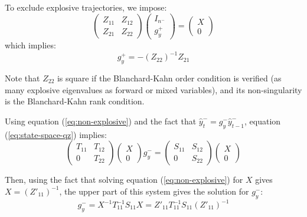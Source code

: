 \documentclass[11pt,a4paper]{article}
\begin{document}
To exclude explosive trajectories, we impose:
\begin{equation}
  \label{eq:non-explosive}
  \left(
    \begin{matrix}
      Z_{11} & Z_{12} \\
      Z_{21} & Z_{22}
    \end{matrix}
  \right)
  \left(
    \begin{matrix}
      I_{n^-} \\
      g^+_y
    \end{matrix}
  \right)
  =
  \left(
    \begin{matrix}
      X \\
      0
    \end{matrix}
  \right)
\end{equation}
which implies:
\begin{equation*}
  g^+_y = -(Z_{22})^{-1} Z_{21}
\end{equation*}

Note that $Z_{22}$ is square if the Blanchard-Kahn order condition is verified (as many explosive eigenvalues as forward or mixed variables), and its non-singularity is the Blanchard-Kahn rank condition.

Using equation (\ref{eq:non-explosive}) and the fact that $\hat{y}^-_t = g^-_y \hat{y}^-_{t-1}$, equation (\ref{eq:state-space-qz}) implies:
\begin{equation*}
  \left(
    \begin{matrix}
      T_{11} & T_{12} \\
      0 & T_{22}
    \end{matrix}
  \right)
  \left(
    \begin{matrix}
      X \\
      0
    \end{matrix}
  \right)
  g^-_y
  =
  \left(
    \begin{matrix}
      S_{11} & S_{12} \\
      0 & S_{22}
    \end{matrix}
  \right)
  \left(
    \begin{matrix}
      X \\
      0
    \end{matrix}
  \right)
\end{equation*}

Then, using the fact that solving equation (\ref{eq:non-explosive}) for $X$ gives $X = (Z'_{11})^{-1}$, the upper part of this system gives the solution for $g^-_y$:
\begin{equation*}
  g^-_y = X^{-1} T_{11}^{-1}S_{11}X = Z'_{11}T_{11}^{-1}S_{11}(Z'_{11})^{-1}
\end{equation*}
\end{document}
